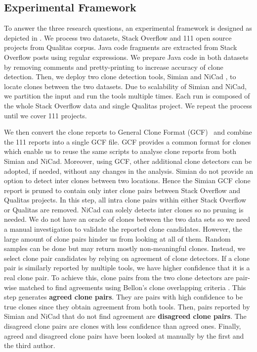 \documentclass{sig-alternate-05-2015}
\begin{document}
\subsection{Experimental Framework}
To answer the three research questions, an experimental framework is designed as depicted in . We process two datasets, Stack Overflow and 111 open source projects from Qualitas corpus. Java code fragments are extracted from Stack Overflow posts using regular expressions. We prepare Java code in both datasets by removing comments and pretty-printing to increase accuracy of clone detection. Then, we deploy two clone detection tools, Simian \cite{simian} and NiCad \cite{Roy2008,Cordy}, to locate clones between the two datasets. Due to scalability of Simian and NiCad, we partition the input and run the tools multiple times. Each run is composed of the whole Stack Overflow data and single Qualitas project. We repeat the process until we cover 111 projects. 

We then convert the clone reports to General Clone Format (GCF)~\cite{Wang2013} and combine the 111 reports into a single GCF file. GCF provides a common format for clones which enable us to reuse the same scripts to analyse clone reports from both Simian and NiCad. Moreover, using GCF, other additional clone detectors can be adopted, if needed, without any changes in the analysis. Simian do not provide an option to detect inter clones between two locations. Hence the Simian GCF clone report is pruned to contain only inter clone pairs between Stack Overflow and Qualitas projects. In this step, all intra clone pairs within either Stack Overflow or Qualitas are removed. NiCad can solely detects inter clones so no pruning is needed. We do not have an oracle of clones between the two data sets so we need a manual investigation to validate the reported clone candidates. However, the large amount of clone pairs hinder us from looking at all of them. Random samples can be done but may return mostly non-meaningful clones. Instead, we select clone pair candidates by relying on agreement of clone detectors. If a clone pair is similarly reported by multiple tools, we have higher confidence that it is a real clone pair. To achieve this, clone pairs from the two clone detectors are pair-wise matched to find agreements using Bellon's clone overlapping criteria \cite{Bellon2007}. This step generates \textbf{agreed clone pairs}. They are pairs with high confidence to be true clones since they obtain agreement from both tools. Then, pairs reported by Simian and NiCad that do not find agreement are \textbf{disagreed clone pairs}. The disagreed clone pairs are clones with less confidence than agreed ones. Finally, agreed and disagreed clone pairs have been looked at manually by the first and the third author.
\end{document}
